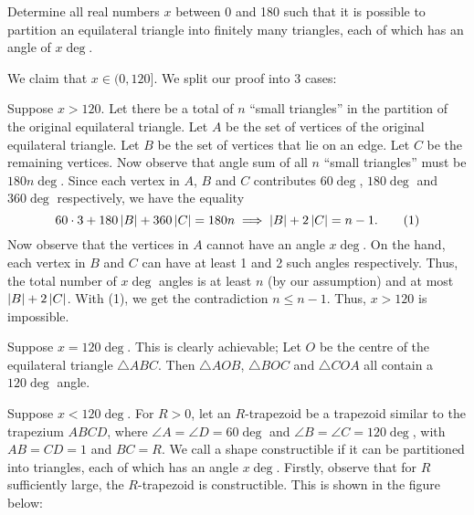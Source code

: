 \begin{question}[$x \in {(0, 120]}$]\label{Q::2023-O-2-5}
    Determine all real numbers $x$ between 0 and 180 such that it is possible to partition an equilateral triangle into finitely many triangles, each of which has an angle of $x\deg$.
\end{question}

\begin{solution*}
    We claim that $x \in (0, 120]$. We split our proof into 3 cases:

     Suppose $x > 120$. Let there be a total of $n$ ``small triangles'' in the partition of the original equilateral triangle. Let $A$ be the set of vertices of the original equilateral triangle. Let $B$ be the set of vertices that lie on an edge. Let $C$ be the remaining vertices. Now observe that angle sum of all $n$ ``small triangles'' must be $180n\deg$. Since each vertex in $A$, $B$ and $C$ contributes $60\deg$, $180\deg$ and $360\deg$ respectively, we have the equality \[60\cdot3 + 180\left\lvert B \right\rvert + 360\left\lvert C \right\rvert = 180n \implies  \left\lvert B \right\rvert + 2\left\lvert C \right\rvert = n-1. \tag{1}\] Now observe that the vertices in $A$ cannot have an angle $x\deg$. On the hand, each vertex in $B$ and $C$ can have at least 1 and 2 such angles respectively. Thus, the total number of $x\deg$ angles is at least $n$ (by our assumption) and at most $\left\lvert B \right\rvert + 2\left\lvert C \right\rvert$. With (1), we get the contradiction $n \leq n-1$. Thus, $x > 120$ is impossible.

     Suppose $x = 120\deg$. This is clearly achievable; Let $O$ be the centre of the equilateral triangle $\triangle ABC$. Then $\triangle AOB$, $\triangle BOC$ and $\triangle COA$ all contain a $120\deg$ angle.

     Suppose $x < 120\deg$. For $R > 0$, let an $R$-trapezoid be a trapezoid similar to the trapezium $ABCD$, where $\angle A = \angle D = 60\deg$ and $\angle B = \angle C = 120\deg$, with $AB = CD = 1$ and $BC = R$. We call a shape constructible if it can be partitioned into triangles, each of which has an angle $x \deg$. Firstly, observe that for $R$ sufficiently large, the $R$-trapezoid is constructible. This is shown in the figure below:
    \begin{center}
\end{center}
\end{solution*}
